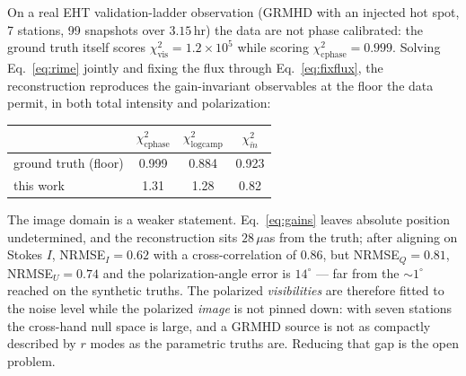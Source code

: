 \documentclass[11pt]{article}
\begin{document}
On a real EHT validation-ladder observation (GRMHD with an injected hot spot, 7
stations, 99 snapshots over $3.15$\,hr) the data are not phase calibrated: the
ground truth itself scores $\chi^2_{\mathrm{vis}}=1.2\times10^5$ while scoring
$\chi^2_{\mathrm{cphase}}=0.999$. Solving Eq.~\eqref{eq:rime} jointly and fixing
the flux through Eq.~\eqref{eq:fixflux}, the reconstruction reproduces the
gain-invariant observables at the floor the data permit, in both total intensity
and polarization:
\begin{center}
\small
\begin{tabular}{lccc}
\toprule
 & $\chi^2_{\mathrm{cphase}}$ & $\chi^2_{\mathrm{logcamp}}$ & $\chi^2_{\breve m}$ \\
\midrule
ground truth (floor) & 0.999 & 0.884 & 0.923 \\
this work            & 1.31  & 1.28  & 0.82 \\
\bottomrule
\end{tabular}
\end{center}
The image domain is a weaker statement. Eq.~\eqref{eq:gains} leaves absolute
position undetermined, and the reconstruction sits $28\,\mu$as from the truth;
after aligning on Stokes $I$, NRMSE$_I=0.62$ with a cross-correlation of $0.86$,
but NRMSE$_Q=0.81$, NRMSE$_U=0.74$ and the polarization-angle error is $14^\circ$
--- far from the ${\sim}1^\circ$ reached on the synthetic truths. The polarized
\emph{visibilities} are therefore fitted to the noise level while the polarized
\emph{image} is not pinned down: with seven stations the cross-hand null space is
large, and a GRMHD source is not as compactly described by $r$ modes as the
parametric truths are. Reducing that gap is the open problem.
\end{document}
